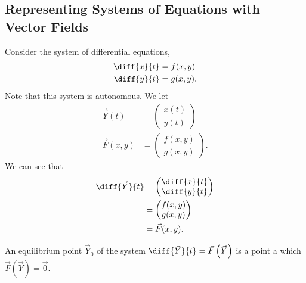 \documentclass[10pt]{mypackage}
\begin{document}
\subsection{Representing Systems of Equations with Vector Fields}%
Consider the system of differential equations,
\begin{align*}
  \diff{x}{t} &= f(x,y)\\
  \diff{y}{t} &= g(x,y).
\end{align*}
Note that this system is autonomous. We let
\begin{align*}
  \vec{Y}(t) &= \begin{pmatrix}x(t)\\y(t)\end{pmatrix}\\
  \vec{F}(x,y) &= \begin{pmatrix}f(x,y)\\g(x,y)\end{pmatrix}.
\end{align*}
We can see that
\begin{align*}
  \diff{\vec{Y}}{t} &= \begin{pmatrix}\diff{x}{t}\\\diff{y}{t}\end{pmatrix}\\
                    &= \begin{pmatrix}f(x,y)\\g(x,y)\end{pmatrix}\\
                    &= \vec{F}(x,y).
\end{align*}
\begin{definition}
  An equilibrium point $\vec{Y}_0$ of the system $\diff{\vec{Y}}{t} = \vec{F}\left(\vec{Y}\right)$ is a point a which $\vec{F}\left(\vec{Y}\right) = \vec{0}$.
\end{definition}
\end{document}

